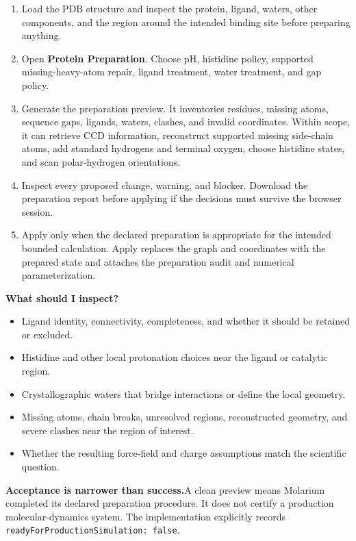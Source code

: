 \documentclass[10pt,letterpaper]{article}
\newcommand{\code}[1]{\texttt{#1}}
\newcommand{\lead}[1]{\textbf{#1}\hspace{0.35em}}
\newcommand{\subhead}[1]{%
  \par\needspace{2\baselineskip}\vspace{2.5pt}%
  {\fontsize{10.91}{13.1}\selectfont\bfseries #1}\par\vspace{-1.5pt}}
\begin{document}
\begin{enumerate}
\item Load the PDB structure and inspect the protein, ligand, waters, other components, and the region around the intended binding site before preparing anything.
\item Open \textbf{Protein Preparation}. Choose pH, histidine policy, supported missing-heavy-atom repair, ligand treatment, water treatment, and gap policy.
\item Generate the preparation preview. It inventories residues, missing atoms, sequence gaps, ligands, waters, clashes, and invalid coordinates. Within scope, it can retrieve CCD information, reconstruct supported missing side-chain atoms, add standard hydrogens and terminal oxygen, choose histidine states, and scan polar-hydrogen orientations.
\item Inspect every proposed change, warning, and blocker. Download the preparation report before applying if the decisions must survive the browser session.
\item Apply only when the declared preparation is appropriate for the intended bounded calculation. Apply replaces the graph and coordinates with the prepared state and attaches the preparation audit and numerical parameterization.
\end{enumerate}

\subhead{What should I inspect?}

\begin{itemize}
\item Ligand identity, connectivity, completeness, and whether it should be retained or excluded.
\item Histidine and other local protonation choices near the ligand or catalytic region.
\item Crystallographic waters that bridge interactions or define the local geometry.
\item Missing atoms, chain breaks, unresolved regions, reconstructed geometry, and severe clashes near the region of interest.
\item Whether the resulting force-field and charge assumptions match the scientific question.
\end{itemize}

\lead{Acceptance is narrower than success.}A clean preview means Molarium completed its declared preparation procedure. It does not certify a production molecular-dynamics system. The implementation explicitly records \code{readyForProductionSimulation: false}.
\end{document}
